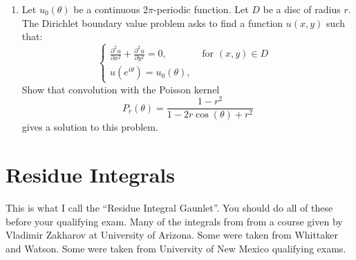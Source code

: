 \documentclass[a4paper,10pt]{article}
\begin{document}
\begin{enumerate}
		
			
		\item Let $u_0(\theta)$ be a continuous $2\pi$-periodic function. 
			Let $D$ be a disc of radius $r$. 
			The Dirichlet boundary value problem asks to find a function $u(x,y)$ such that:
			$$ \begin{cases}
			\frac{\partial^2 u}{\partial x^2} + \frac{\partial^2 u}{\partial y^2} =0, & \mbox{ for $(x,y)\in D$ } \\
			u(e^{i\theta})= u_0(\theta), & 
			\end{cases}
			$$
			Show that convolution with the Poisson kernel 
			$$P_r(\theta) = \frac{1-r^2}{1-2r\cos(\theta) + r^2}$$
			gives a solution to this problem. 
			
	
	

	
\end{enumerate}

\newpage
\section{Residue Integrals}
This is what I call the ``Residue Integral Gaunlet''. You should do all of these before your qualifying exam. 
Many of the integrals from from a course given by Vladimir Zakharov at University of Arizona. 
Some were taken from Whittaker and Watson. Some were taken from University of New Mexico qualifying exams.
\end{document}
